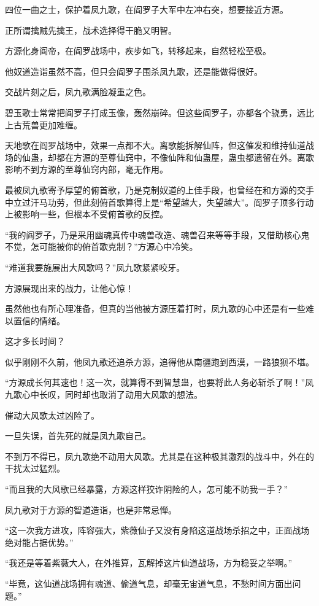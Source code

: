 \begin{this_body}
四位一曲之士，保护着凤九歌，在阎罗子大军中左冲右突，想要接近方源。

正所谓擒贼先擒王，战术选择得干脆又明智。

方源化身阎帝，在阎罗战场中，疾步如飞，转移起来，自然轻松至极。

他奴道造诣虽然不高，但只会阎罗子围杀凤九歌，还是能做得很好。

交战片刻之后，凤九歌满脸凝重之色。

碧玉歌士常常把阎罗子打成玉像，轰然崩碎。但这些阎罗子，亦都各个骁勇，远比上古荒兽更加难缠。

天地歌在阎罗战场中，效果一点都不大。离歌能拆解仙阵，但这催发和维持仙道战场的仙蛊，却都在方源的至尊仙窍中，不像仙阵和仙蛊屋，蛊虫都遗留在外。离歌影响不到方源的至尊仙窍内部，毫无作用。

最被凤九歌寄予厚望的俯首歌，乃是克制奴道的上佳手段，也曾经在和方源的交手中立过汗马功劳，但此刻俯首歌算得上是“希望越大，失望越大”。阎罗子顶多行动上被影响一些，但根本不受俯首歌的反控。

“我的阎罗子，乃是采用幽魂真传中魂兽改造、魂兽召来等等手段，又借助核心鬼不觉，怎可能被你的俯首歌克制？”方源心中冷笑。

“难道我要施展出大风歌吗？”凤九歌紧紧咬牙。

方源展现出来的战力，让他心惊！

虽然他也有所心理准备，但真的当他被方源压着打时，凤九歌的心中还是有一些难以置信的情绪。

这才多长时间？

似乎刚刚不久前，他凤九歌还追杀方源，追得他从南疆跑到西漠，一路狼狈不堪。

“方源成长何其速也！这一次，就算得不到智慧蛊，也要将此人务必斩杀了啊！”凤九歌心中长叹，同时却也取消了动用大风歌的想法。

催动大风歌太过凶险了。

一旦失误，首先死的就是凤九歌自己。

不到万不得已，凤九歌绝不动用大风歌。尤其是在这种极其激烈的战斗中，外在的干扰太过猛烈。

“而且我的大风歌已经暴露，方源这样狡诈阴险的人，怎可能不防我一手？”

凤九歌对于方源的智道造诣，也是非常忌惮。

“这一次我方进攻，阵容强大，紫薇仙子又没有身陷这道战场杀招之中，正面战场绝对能占据优势。”

“我还是等着紫薇大人，在外推算，瓦解掉这片仙道战场，方为稳妥之举啊。”

“毕竟，这仙道战场拥有魂道、偷道气息，却毫无宙道气息，不愁时间方面出问题。”


\end{this_body}
